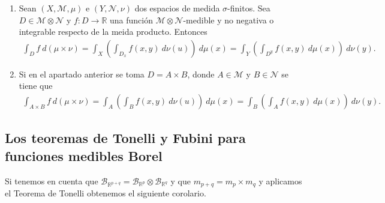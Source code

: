 \begin{obs}
\begin{enumerate}
    \item Sean $(X, \mathcal{M}, \mu)$ e $(Y, \mathcal{N}, \nu)$ dos espacios de medida $\sigma$-finitos. Sea $D \in \mathcal{M} \otimes \mathcal{N}$ y $f: D \longrightarrow \mathbb{R}$ una función $\mathcal{M} \otimes \mathcal{N}$-medible y no negativa o integrable respecto de la meida producto. Entonces
    \begin{align*}
        \int_{D}{f \ d(\mu \times \nu)} = \int_{X}\left( \int_{D_x}{f(x,y) \ d\nu(u)}\right) \ d\mu(x) = \int_{Y}\left( \int_{D^y}{f(x,y) \ d\mu(x)}\right) \ d\nu(y).
    \end{align*}
    \item Si en el apartado anterior se toma $D = A \times B$, donde $A \in \mathcal{M}$ y $B \in \mathcal{N}$ se tiene que
    \begin{align*}
        \int_{A\times B}{f \ d(\mu \times \nu)} = \int_{A}\left( \int_{B}{f(x,y) \ d\nu(u)}\right) \ d\mu(x) = \int_{B}\left( \int_{A}{f(x,y) \ d\mu(x)}\right) \ d\nu(y).
    \end{align*}
\end{enumerate}
\end{obs}

\subsection{Los teoremas de Tonelli y Fubini para funciones medibles Borel}

Si tenemos en cuenta que $\mathcal{B}_{\mathbb{R}^{p+q}} = \mathcal{B}_{\mathbb{R}^{p}} \otimes \mathcal{B}_{\mathbb{R}^{q}}$ y que $m_{p+q} = m_p \times m_q$ y aplicamos el Teorema de Tonelli obtenemos el siguiente corolario.

